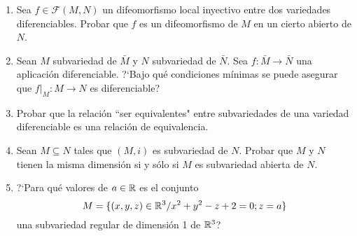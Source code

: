 \documentclass[Cursovd_portada.tex]{subfiles}
\begin{document}
\begin{enumerate}
\item Sea $f\in\mathcal{F}(M,N)$ un difeomorfismo local inyectivo entre dos
variedades diferenciables. Probar que $f$ es un difeomorfismo de
$M$ en un cierto abierto de $N$. \item Sean $M$ subvariedad de
$\bar{M}$ y $N$ subvariedad de $\bar{N}$. Sea $f: \bar{M}
\longrightarrow \bar{N}$ una aplicación diferenciable. ?`Bajo
qué condiciones mínimas se puede asegurar que $f|_M:M
\longrightarrow N$ es diferenciable? \item Probar que la
relación ``ser equivalentes" entre subvariedades de una
variedad diferenciable es una relación de equivalencia.
\item Sean $M\subseteq N$ tales que $(M,i)$ es subvariedad de $N$. Probar que $M$ y $N$ tienen la misma dimensión si y sólo si $M$ es subvariedad abierta de $N$.
\item
?`Para qué valores de $a\in\mathbb{R}$ es el conjunto
$$M=\{(x,y,z)\in\mathbb{R}^3/x^2+y^2-z+2=0;z=a\}$$
una subvariedad regular de dimensión 1 de $\mathbb{R}^3$?
\end{enumerate}
\end{document}
